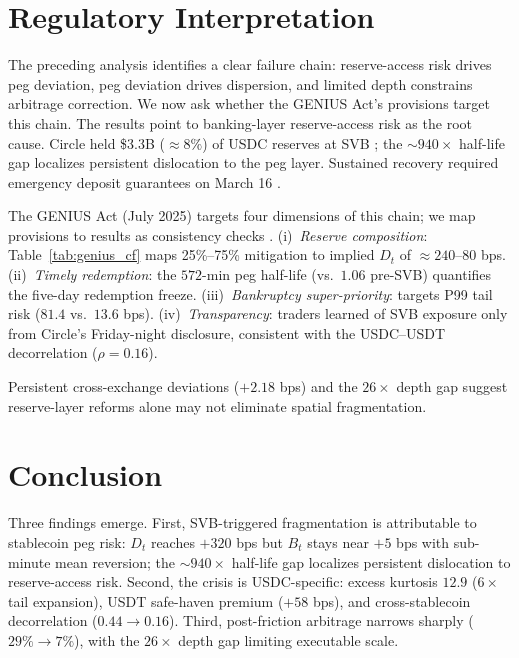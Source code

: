 \documentclass[12pt]{article}
\begin{document}
\section{Regulatory Interpretation}\label{sec:regulation}

The preceding analysis identifies a clear failure chain: reserve-access risk drives peg deviation, peg deviation drives dispersion, and limited depth constrains arbitrage correction. We now ask whether the GENIUS Act's provisions target this chain. The results point to banking-layer reserve-access risk as the root cause. Circle held \$3.3B (${\approx}8\%$) of USDC reserves at SVB \cite{circle2023}; the ${\sim}940\times$ half-life gap localizes persistent dislocation to the peg layer. Sustained recovery required emergency deposit guarantees on March 16 \cite{jointstatement2023}.

The GENIUS Act (July 2025) targets four dimensions of this chain; we map provisions to results as consistency checks \cite{genius2025}. (i)~\emph{Reserve composition}: Table~\ref{tab:genius_cf} maps 25\%--75\% mitigation to implied $D_t$ of ${\approx}240$--$80$ bps. (ii)~\emph{Timely redemption}: the $572$-min peg half-life (vs.\ $1.06$ pre-SVB) quantifies the five-day redemption freeze. (iii)~\emph{Bankruptcy super-priority}: targets P99 tail risk ($81.4$ vs.\ $13.6$ bps). (iv)~\emph{Transparency}: traders learned of SVB exposure only from Circle's Friday-night disclosure, consistent with the USDC--USDT decorrelation ($\rho{=}0.16$).



Persistent cross-exchange deviations ($+2.18$ bps) and the $26\times$ depth gap suggest reserve-layer reforms alone may not eliminate spatial fragmentation.

\section{Conclusion}\label{sec:conclusion}

Three findings emerge. First, SVB-triggered fragmentation is attributable to stablecoin peg risk: $D_t$ reaches $+320$ bps but $B_t$ stays near $+5$ bps with sub-minute mean reversion; the ${\sim}940\times$ half-life gap localizes persistent dislocation to reserve-access risk. Second, the crisis is USDC-specific: excess kurtosis $12.9$ ($6\times$ tail expansion), USDT safe-haven premium ($+58$ bps), and cross-stablecoin decorrelation ($0.44\to0.16$). Third, post-friction arbitrage narrows sharply ($29\%\to7\%$), with the $26\times$ depth gap limiting executable scale.
\end{document}
